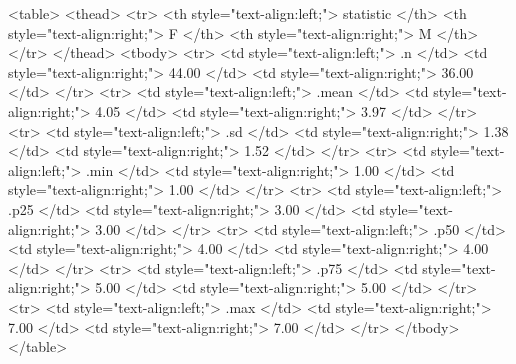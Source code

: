 <table>
 <thead>
  <tr>
   <th style="text-align:left;"> statistic </th>
   <th style="text-align:right;"> F </th>
   <th style="text-align:right;"> M </th>
  </tr>
 </thead>
<tbody>
  <tr>
   <td style="text-align:left;"> .n </td>
   <td style="text-align:right;"> 44.00 </td>
   <td style="text-align:right;"> 36.00 </td>
  </tr>
  <tr>
   <td style="text-align:left;"> .mean </td>
   <td style="text-align:right;"> 4.05 </td>
   <td style="text-align:right;"> 3.97 </td>
  </tr>
  <tr>
   <td style="text-align:left;"> .sd </td>
   <td style="text-align:right;"> 1.38 </td>
   <td style="text-align:right;"> 1.52 </td>
  </tr>
  <tr>
   <td style="text-align:left;"> .min </td>
   <td style="text-align:right;"> 1.00 </td>
   <td style="text-align:right;"> 1.00 </td>
  </tr>
  <tr>
   <td style="text-align:left;"> .p25 </td>
   <td style="text-align:right;"> 3.00 </td>
   <td style="text-align:right;"> 3.00 </td>
  </tr>
  <tr>
   <td style="text-align:left;"> .p50 </td>
   <td style="text-align:right;"> 4.00 </td>
   <td style="text-align:right;"> 4.00 </td>
  </tr>
  <tr>
   <td style="text-align:left;"> .p75 </td>
   <td style="text-align:right;"> 5.00 </td>
   <td style="text-align:right;"> 5.00 </td>
  </tr>
  <tr>
   <td style="text-align:left;"> .max </td>
   <td style="text-align:right;"> 7.00 </td>
   <td style="text-align:right;"> 7.00 </td>
  </tr>
</tbody>
</table>
